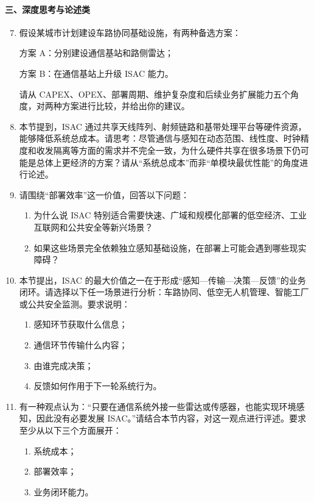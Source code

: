 \paragraph{三、深度思考与论述类}
\begin{enumerate}
    \setcounter{enumi}{6}
    \item 假设某城市计划建设车路协同基础设施，有两种备选方案：

    方案 A：分别建设通信基站和路侧雷达；

    方案 B：在通信基站上升级 ISAC 能力。

    请从 CAPEX、OPEX、部署周期、维护复杂度和后续业务扩展能力五个角度，对两种方案进行比较，并给出你的建议。

    \item 本节提到，ISAC 通过共享天线阵列、射频链路和基带处理平台等硬件资源，能够降低系统总成本。请思考：尽管通信与感知在动态范围、线性度、时钟精度和收发隔离等方面的需求并不完全一致，为什么硬件共享在很多场景下仍可能是总体上更经济的方案？请从“系统总成本”而非“单模块最优性能”的角度进行论述。

    \item 请围绕“部署效率”这一价值，回答以下问题：
    \begin{enumerate}
        \item 为什么说 ISAC 特别适合需要快速、广域和规模化部署的低空经济、工业互联网和公共安全等新兴场景？
        \item 如果这些场景完全依赖独立感知基础设施，在部署上可能会遇到哪些现实障碍？
    \end{enumerate}

    \item 本节提出，ISAC 的最大价值之一在于形成“感知—传输—决策—反馈”的业务闭环。请选择以下任一场景进行分析：车路协同、低空无人机管理、智能工厂或公共安全监测。要求说明：
    \begin{enumerate}
        \item 感知环节获取什么信息；
        \item 通信环节传输什么内容；
        \item 由谁完成决策；
        \item 反馈如何作用于下一轮系统行为。
    \end{enumerate}

    \item 有一种观点认为：“只要在通信系统外接一些雷达或传感器，也能实现环境感知，因此没有必要发展 ISAC。”请结合本节内容，对这一观点进行评述。要求至少从以下三个方面展开：
    \begin{enumerate}
        \item 系统成本；
        \item 部署效率；
        \item 业务闭环能力。
    \end{enumerate}


\end{enumerate}
